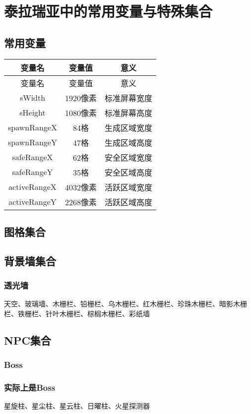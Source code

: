 \chapter{泰拉瑞亚中的常用变量与特殊集合}
\section{常用变量}
\begin{longtable}{ccc}
变量名&变量值&意义\\\hline
\endfirsthead
变量名&变量值&意义\\\hline
\endhead
\hline
\endfoot
sWidth&1920像素&标准屏幕宽度\\\hline
sHeight&1080像素&标准屏幕高度\\\hline
spawnRangeX&84格&生成区域宽度\\\hline
spawnRangeY&47格&生成区域高度\\\hline
safeRangeX&62格&安全区域宽度\\\hline
safeRangeY&35格&安全区域高度\\\hline
activeRangeX&4032像素&活跃区域宽度\\\hline
activeRangeY&2268像素&活跃区域高度
\end{longtable}

\section{图格集合}
\section{背景墙集合}
\subsection{透光墙}\label{app9}
天空、玻璃墙、木栅栏、铅栅栏、乌木栅栏、红木栅栏、珍珠木栅栏、暗影木栅栏、铁栅栏、针叶木栅栏、棕榈木栅栏、彩纸墙
\section{NPC集合}
\subsection{Boss}
\subsection{实际上是Boss}\label{app10}
星旋柱、星尘柱、星云柱、日曜柱、火星探测器
